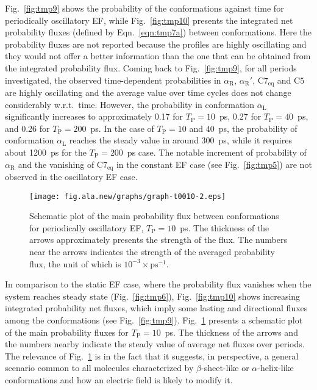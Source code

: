 \documentclass[a4paper,preprint,unsortedaddress,onecolumn]{revtex4-1}
\newcommand{\period}[0]{T_{\textrm{P}}}
\newcommand{\confaa}[0]{{\alpha_{\textrm{R}}}}
\newcommand{\confab}[0]{{\alpha_{\textrm{R}}'}}
\newcommand{\confba}[0]{{\textrm{C}7_{\textrm{eq}}}}
\newcommand{\confbb}[0]{{\textrm{C}5}}
\newcommand{\confc}[0]{{\alpha_{\textrm{L}}}}
\begin{document}
Fig.~\ref{fig:tmp9} shows the probability of the
conformations against time for periodically oscillatory EF,
while  
Fig.~\ref{fig:tmp10} presents the integrated net probability fluxes
(defined by Eqn.~\eqref{eqn:tmp7a}) between
conformations. Here the probability fluxes are not reported
because the profiles are highly oscillating and they would not offer 
a better information than the one that can be obtained from the integrated probability flux.
Coming back to Fig.~\ref{fig:tmp9}, for all periods investigated,
the observed time-dependent probabilities  in $\confaa$, $\confab$, $\confba$ and $\confbb$ are
highly oscillating and the average value over time cycles does not change
considerably w.r.t.~time.
However, the probability in conformation $\confc$ significantly
increases to approximately 0.17 for $\period =10$~ps, 0.27 for  $\period =40$~ps, and
0.26 for $\period =200$~ps.
In the case of $\period =10$ and $40$~ps, {the probability of conformation $\confc$}
reaches the steady value in around 300~ps, while it requires about 1200~ps
for the $\period =200$~ps case. 
The notable increment of probability of $\confaa$ and
  the vanishing of $\confba$ in the constant EF case (see Fig.~\ref{fig:tmp5})
are not observed in the oscillatory EF case.
\begin{figure}
  \centering
  \texttt{[image: fig.ala.new/graphs/graph-t0010-2.eps]}
  \caption{Schematic plot of the main probability flux between conformations
    for periodically oscillatory EF, $\period =10$~ps. The thickness 
    of the arrows approximately presents the strength of the flux.
    The numbers near the arrows indicates the strength of the averaged
    probability flux, the unit of which is $10^{-3}\times\textrm{ps}^{-1}$.
  }
  \label{fig:tmp11}
\end{figure}
In comparison to the static EF case, where the probability flux
vanishes when the system reaches steady state (Fig.~\ref{fig:tmp6}), 
Fig.~\ref{fig:tmp10} shows increasing
integrated probability net fluxes, which imply some lasting and directional
fluxes among the conformations (see Fig.~\ref{fig:tmp9}).
Fig.~\ref{fig:tmp11} presents
a schematic plot of the main probability fluxes for $\period =10$~ps.
The thickness of the arrows and the numbers nearby indicate
the steady value of average net fluxes over periods.
The relevance of Fig.~\ref{fig:tmp11} is in the fact that it suggests,
in perspective, a general scenario common to all molecules
characterized by $\beta$-sheet-like or $\alpha$-helix-like
conformations and how an electric field is likely to modify it.
\end{document}
